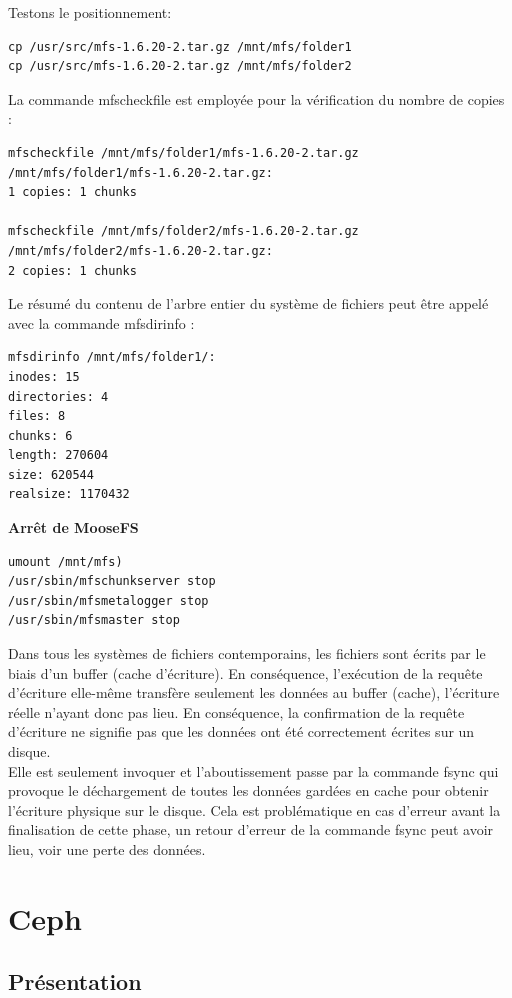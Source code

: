\documentclass[12pt]{report}
\begin{document}
Testons le positionnement:
\begin{lstlisting}
cp /usr/src/mfs-1.6.20-2.tar.gz /mnt/mfs/folder1
cp /usr/src/mfs-1.6.20-2.tar.gz /mnt/mfs/folder2
	  \end{lstlisting}
\newpage
La commande mfscheckfile est employée pour la vérification du nombre de copies :
\begin{lstlisting}
mfscheckfile /mnt/mfs/folder1/mfs-1.6.20-2.tar.gz
/mnt/mfs/folder1/mfs-1.6.20-2.tar.gz:
1 copies: 1 chunks

mfscheckfile /mnt/mfs/folder2/mfs-1.6.20-2.tar.gz
/mnt/mfs/folder2/mfs-1.6.20-2.tar.gz:
2 copies: 1 chunks
	  \end{lstlisting}
Le résumé du contenu de l'arbre entier du système de fichiers peut être appelé avec la commande mfsdirinfo :
\begin{lstlisting}
mfsdirinfo /mnt/mfs/folder1/:
inodes: 15
directories: 4
files: 8
chunks: 6
length: 270604
size: 620544
realsize: 1170432
	  \end{lstlisting}
\textbf{Arrêt de MooseFS}\\
\begin{lstlisting}
umount /mnt/mfs)
/usr/sbin/mfschunkserver stop
/usr/sbin/mfsmetalogger stop
/usr/sbin/mfsmaster stop
	  \end{lstlisting}
Dans tous les systèmes de fichiers contemporains, les fichiers sont écrits par le biais d'un buffer (cache d'écriture). En conséquence, l'exécution de la requête d'écriture elle-même transfère seulement les données au buffer (cache), l'écriture réelle n'ayant donc pas lieu. En conséquence, la confirmation de la requête d'écriture ne signifie pas que les données ont été correctement écrites sur un disque.\\ Elle est seulement invoquer et l'aboutissement passe par la commande fsync qui provoque le déchargement de toutes les données gardées en cache pour obtenir l'écriture physique sur le disque. Cela est problématique en cas d'erreur avant la finalisation de cette phase, un retour d'erreur de la commande fsync peut avoir lieu, voir une perte des données. 

	\chapter{Ceph}
		\section{Présentation}
\end{document}
